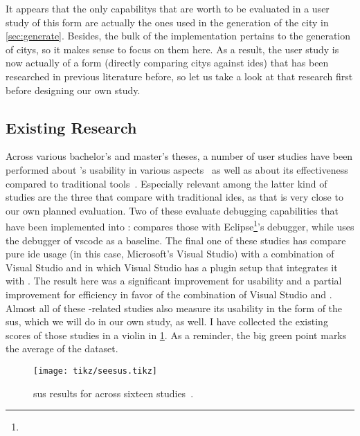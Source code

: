\documentclass[../thesis]{subfiles}
\begin{document}
It appears that the only \glspl{capability} that are worth to be evaluated in a user study of this form are actually the ones used in the generation of the \gls{city} in \cref{sec:generate}.
Besides, the bulk of the implementation pertains to the generation of \glspl{city}, so it makes sense to focus on them here.
As a result, the user study is now actually of a form (directly comparing \glspl{city} against \glspl{ide}) that has been researched in previous literature before, so let us take a look at that research first before designing our own study.

\subsection{Existing Research}\label{subsec:research}
Across various bachelor's and master's theses, a number of user studies have been performed about \SEE{}'s usability in various aspects~\cite{davidwagner2020, felixgaebler2021, hannesmasuch2020, kevindoehl2020, maximilianwick2022, michelkrause2024, robertbohnsack2020, rubensmidt2021} as well as about its effectiveness compared to traditional tools~\cite{galperin2021, lennartkipka2020, moritz, nicoweiser2021, rohlfing2024, schramm2022, sulanabubakarov2021, yannisrohloff2021}.
Especially relevant among the latter kind of studies are the three that compare \SEE{} with traditional \glspl{ide}, as that is very close to our own planned evaluation.
Two of these evaluate debugging capabilities that have been implemented into \SEE{}:
\textcite{lennartkipka2020} compares those with Eclipse\footnote{
}'s debugger, while \textcite{rohlfing2024} uses the debugger of \gls{vscode} as a baseline.
The final one of these studies has \textcite{schramm2022} compare pure \gls{ide} usage (in this case, Microsoft's Visual Studio) with a combination of Visual Studio and \SEE{} in which Visual Studio has a plugin setup that integrates it with \SEE{}.
The result here was a significant improvement for usability and a partial improvement for efficiency in favor of the combination of Visual Studio and \SEE{}.
Almost all of these \SEE{}-related studies also measure its usability in the form of the \gls{sus}, which we will do in our own study, as well.
I have collected the existing scores of those studies in a \gls{violin} in \cref{fig:seesus}.
As a reminder, the big green point marks the average of the dataset.


\begin{figure}
	\centering
	\texttt{[image: tikz/seesus.tikz]}
	\caption{\Gls{sus} results for \SEE{} across sixteen studies~\cite{davidwagner2020, felixgaebler2021, galperin2021, hannesmasuch2020, kevindoehl2020, lennartkipka2020, maximilianwick2022, michelkrause2024, moritz, nicoweiser2021, robertbohnsack2020, rohlfing2024, rubensmidt2021, schramm2022, sulanabubakarov2021, yannisrohloff2021}.}\label{fig:seesus}
\end{figure}
\end{document}
